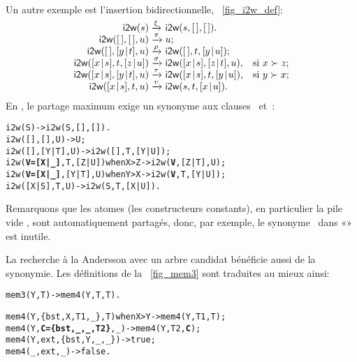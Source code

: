 \noindent Un autre exemple est l'insertion bidirectionnelle,
\fig~\vref{fig_i2w_def}:
\begin{equation*}
\begin{array}{@{}r@{\;}l@{\;}ll@{}}
\fun{i2w}(s)         & \xrightarrow{\smash{\xi}}
                     & \fun{i2w}(s,\el,\el).\\
\fun{i2w}(\el,\el,u) & \xrightarrow{\smash{\pi}} 
                     & u;\\
\fun{i2w}(\el,\cons{y}{t},u)
                     & \xrightarrow{\smash{\rho}}
                     & \fun{i2w}(\el,t,\cons{y}{u});\\
\fun{i2w}(\cons{x}{s},t,\cons{z}{u})
                     & \xrightarrow{\smash{\sigma}}
                     & \fun{i2w}(\cons{x}{s},\cons{z}{t},u),
                     & \text{si \(x \succ z\)};\\
\fun{i2w}(\cons{x}{s},\cons{y}{t},u)
                     & \xrightarrow{\smash{\tau}}
                     & \fun{i2w}(\cons{x}{s},t,\cons{y}{u}),
                     & \text{si \(y \succ x\)};\\
\fun{i2w}(\cons{x}{s},t,u)
                     & \xrightarrow{\smash{\upsilon}}
                     & \fun{i2w}(s,t,\cons{x}{u}).
\end{array}
\end{equation*}
En \Erlang, le partage maximum exige un synonyme aux clauses
\clause{\sigma}~et~\clause{\tau}:
\begin{alltt}
i2w(S)                              -> i2w(S,[],[]).
i2w(     [],   [],    U)            -> U;
i2w(     [],[Y|T],    U)            -> i2w([],T,[Y|U]);
i2w(\textbf{V=[X|\_]},    T,[Z|U]) when X > Z -> i2w(\textbf{V},[Z|T],U);
i2w(\textbf{V=[X|\_]},[Y|T],    U) when Y > X -> i2w(\textbf{V},T,[Y|U]);
i2w(  [X|S],    T,    U)            -> i2w(S,T,[X|U]).
\end{alltt}
Remarquons que les atomes (les constructeurs constants), en
particulier la pile vide \erlcode{[]}, sont automatiquement partagés,
donc, par exemple, le synonyme~ dans «» est inutile.

La recherche à la Andersson avec un arbre candidat bénéficie aussi de
la synonymie. Les définitions de la \fig~\vref{fig_mem3} sont
traduites au mieux ainsi:
\begin{alltt}
mem3(Y,T) -> mem4(Y,T,T).

mem4(Y,  \{bst,X,T1,_\},        T) when X > Y -> mem4(Y,T1,T);
mem4(Y,\textbf{C=\{bst,_,_,T2\}},        _)            -> mem4(Y,T2,\textbf{C});
mem4(Y,         ext,\{bst,Y,_,_\})            -> true;
mem4(_,           ext,        _)            -> false.
\end{alltt}

